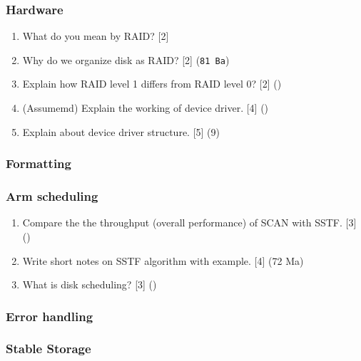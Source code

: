 \documentclass[12pt]{article}
\begin{document}
		\subsubsection{Hardware}
			\begin{enumerate}[noitemsep, topsep=0pt]
				\item What do you mean by RAID? \hfill [2] 
				
				\item Why do we organize disk as RAID? \hfill [2] (\texttt{81 Ba})

				\item Explain how RAID level 1 differs from RAID level 0? \hfill [2] ()

				\item (Assumemd) Explain the working of device driver. \hfill [4] ()

				\item Explain about device driver structure. \hfill [5] (9)
			\end{enumerate}
		\subsubsection{Formatting}
		\subsubsection{Arm scheduling}
			\begin{enumerate}[noitemsep, topsep=0pt]
				\item Compare the the throughput (overall performance) of SCAN with SSTF. \hfill [3] ()

				\item Write short notes on SSTF algorithm with example. \hfill [4] (72 Ma)

				\item What is disk scheduling? \hfill [3] ()
			\end{enumerate}

		\subsubsection{Error handling}
		\subsubsection{Stable Storage}
\end{document}
